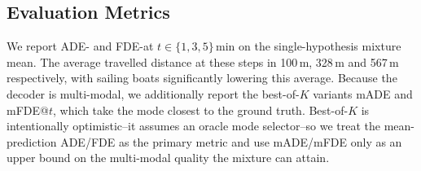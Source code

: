 \documentclass[runningheads]{preamp/llncs}
\begin{document}

\subsection{Evaluation Metrics}

We report \ac{ADE}- and \ac{FDE}-at $t \in \{1,3,5\}$\,min
on the single-hypothesis mixture mean.
%
The average travelled distance at these steps in 100\,m, 328\,m and 567\,m respectively,
with sailing boats significantly lowering this average.
%
Because the decoder is multi-modal,
we additionally report the best-of-$K$ variants \ac{mADE} and \ac{mFDE}@$t$, which take the mode closest to the ground truth. Best-of-$K$
is intentionally optimistic--it assumes an oracle mode selector--so we treat the
mean-prediction \ac{ADE}/\ac{FDE} as the primary metric and use \ac{mADE}/\ac{mFDE}
only as an upper bound on the multi-modal quality the mixture can attain.
\end{document}
